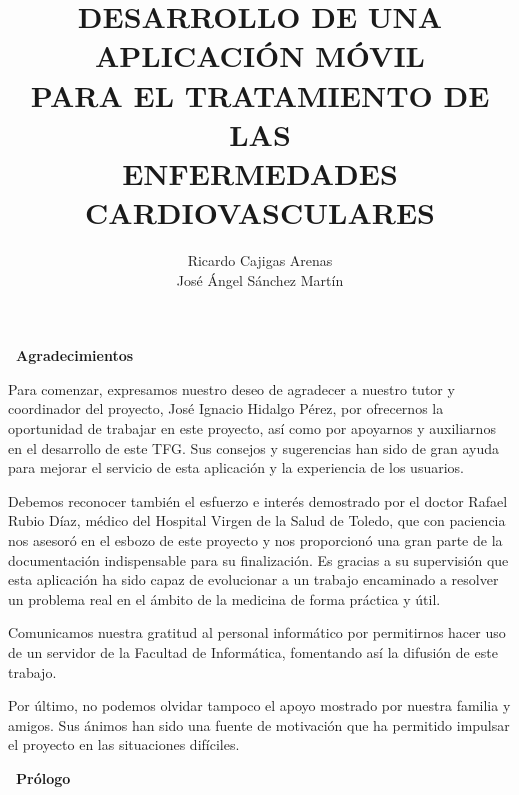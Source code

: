 \documentclass[11pt,spanish,
		listoftables,listoffigures]
		{tfgplantilla}
\title{\MakeUppercase{Desarrollo de una aplicación móvil} \\
	\MakeUppercase{para el tratamiento de las} \\
         \MakeUppercase{Enfermedades Cardiovasculares}}
\author{Ricardo Cajigas Arenas \\ José Ángel Sánchez Martín}
\begin{document}


\setcounter{page}{1}
\cleardoublepage
{\par\hfill \sffamily\bfseries\Huge\ Agradecimientos}

Para comenzar, expresamos nuestro deseo de agradecer a nuestro tutor y coordinador del proyecto, José Ignacio Hidalgo Pérez, por ofrecernos la oportunidad de trabajar en este proyecto, así como por apoyarnos y auxiliarnos en el desarrollo de este TFG. Sus consejos y sugerencias han sido de gran ayuda para mejorar el servicio de esta aplicación y la experiencia de los usuarios.

Debemos reconocer también el esfuerzo e interés demostrado por el doctor Rafael Rubio Díaz, médico del Hospital Virgen de la Salud de Toledo, que con paciencia nos asesoró en el esbozo de este proyecto y nos proporcionó una gran parte de la documentación indispensable para su finalización. Es gracias a su supervisión que esta aplicación ha sido capaz de evolucionar a un trabajo encaminado a resolver un problema real en el ámbito de la medicina de forma práctica y útil.

Comunicamos nuestra gratitud al personal informático por permitirnos hacer uso de un servidor de la Facultad de Informática, fomentando así la difusión de este trabajo.

Por último, no podemos olvidar tampoco el apoyo mostrado por nuestra familia y amigos. Sus ánimos han sido una fuente de motivación que ha permitido impulsar el proyecto en las situaciones difíciles. 

\cleardoublepage
{\par\hfill \sffamily\bfseries\Huge\ Prólogo}
\end{document}
